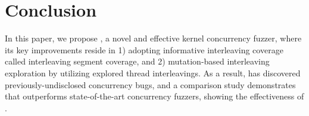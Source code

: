 \section{Conclusion}
\label{s:conclusion}




In this paper, we propose \sys, a novel and effective kernel
concurrency fuzzer, where its key improvements reside in 1) adopting
informative interleaving coverage called interleaving segment
coverage, and 2) mutation-based interleaving exploration by utilizing
explored thread interleavings.
%
As a result, \sys has discovered \totalbugs previously-undisclosed
concurrency bugs, and a comparison study demonstrates that \sys
outperforms state-of-the-art concurrency fuzzers, showing the
effectiveness of \sys.



